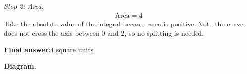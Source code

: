 \documentclass[11pt]{article}
\begin{document}
\textit{Step 2: Area.}
\[\begin{gathered}
\text{Area} = 4
\end{gathered}\]
Take the absolute value of the integral because area is positive. Note the curve does not cross the axis between 0 and 2, so no splitting is needed.

\begin{answerbox}
\textbf{Final answer:}\quad \(\displaystyle  4 \) square units
\end{answerbox}
\textbf{Diagram.}

\begin{center}
\end{center}
\end{document}
